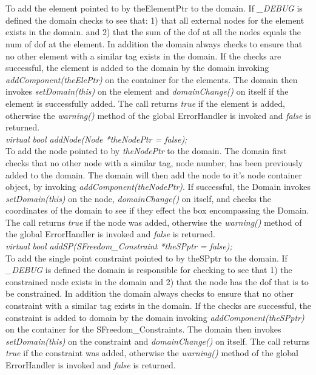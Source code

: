   \\
  \\
To add the element pointed to by theElementPtr to the domain. 
If {\em \_DEBUG} is defined the domain checks to
see that: 1) that all external nodes for the element exists in the
domain. and 2) that the sum of the dof at all the nodes equals the num
of dof at the element. In addition the domain always checks to ensure
that no other element with a similar tag exists in the domain.
If the checks are successful, the element is added to
the domain by the domain invoking {\em addComponent(theElePtr)} on
the container for the elements. The domain then invokes {\em
setDomain(this)} on the element and {\em domainChange()} on
itself if the element is successfully added. The call returns {\em
true} if the element is added, otherwise the {\em warning()} method of
the global ErrorHandler is invoked and {\em false} is returned.\\

{\em virtual bool addNode(Node *theNodePtr = false);}  \\
To add the node pointed to by {\em theNodePtr} to the domain. 
The domain first checks that no other node with a similar tag,
node number, has been previously added to the domain. The
domain will then add the node to it's node container object, by
invoking {\em addComponent(theNodePtr)}. If successful, the Domain
invokes {\em setDomain(this)} on the node, {\em domainChange()} on
itself, and checks the coordinates of the domain to see if they effect
the box encompassing the Domain. The call returns {\em true} if the
node was added, otherwise the {\em warning()} method of
the global ErrorHandler is invoked and {\em false} is returned.\\


{\em virtual bool addSP(SFreedom\_Constraint *theSPptr = false);}  \\
To add the single point constraint pointed to by theSPptr to the
domain. If {\em \_DEBUG} is defined the domain is responsible for
checking to see that 1) the constrained node exists in the domain and
2) that the node has the dof that is to be constrained. 
In addition the domain always checks to ensure that no other
constraint with a similar tag exists in the domain. If the checks are
successful, the constraint is added to domain by the domain invoking {\em
addComponent(theSPptr)} on the container for the SFreedom\_Constraints. The
domain then invokes {\em setDomain(this)} on the 
constraint and {\em domainChange()} on itself. The call returns {\em
true} if the constraint was added, otherwise the {\em warning()} method of
the global ErrorHandler is invoked and {\em false} is returned.\\



